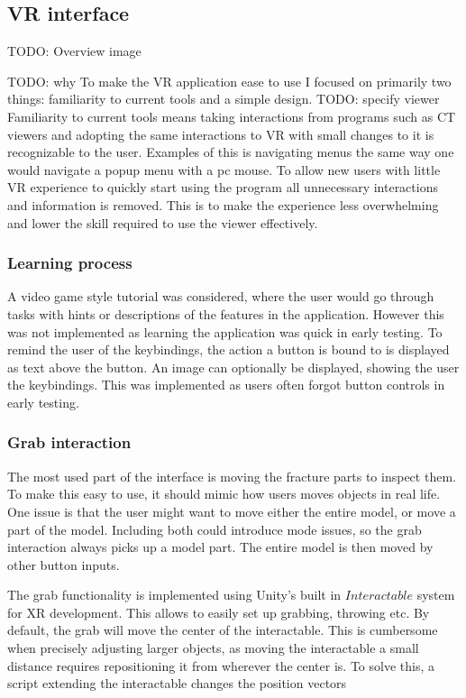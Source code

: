 \documentclass[a4paper]{report}
\begin{document}
\subsection{VR interface}

TODO: Overview image

TODO: why
To make the VR application ease to use I focused on primarily two things: familiarity to current tools and a simple design.
TODO: specify viewer
Familiarity to current tools means taking interactions from programs such as CT viewers and adopting the same interactions to VR with small changes to it is recognizable to the user. Examples of this is navigating menus the same way one would navigate a popup menu with a pc mouse.
To allow new users with little VR experience to quickly start using the program all unnecessary interactions and information is removed. This is to make the experience less overwhelming and lower the skill required to use the viewer effectively.

\subsubsection{Learning process}
A video game style tutorial was considered, where the user would go through tasks with hints or descriptions of the features in the application. However this was not implemented as learning the application was quick in early testing.
To remind the user of the keybindings, the action a button is bound to  is displayed as text above the button. An image can optionally be displayed, showing the user the keybindings. This was implemented as users often forgot button controls in early testing.

\subsubsection{Grab interaction}

The most used part of the interface is moving the fracture parts to inspect them. To make this easy to use, it should mimic how users moves objects in real life.
One issue is that the user might want to move either the entire model, or move a part of the model. Including both could introduce mode issues\cite{nngroup}, so the grab interaction always picks up a model part. The entire model is then moved by other button inputs.

The grab functionality is implemented using Unity's built in $Interactable$ system for XR\cite{noauthor_xr_nodate} development. This allows to easily set up grabbing, throwing etc. By default, the grab will move the center of the interactable. This is cumbersome when precisely adjusting larger objects, as moving the interactable a small distance requires repositioning it from wherever the center is. To solve this, a script extending the interactable changes the position vectors 
\end{document}
